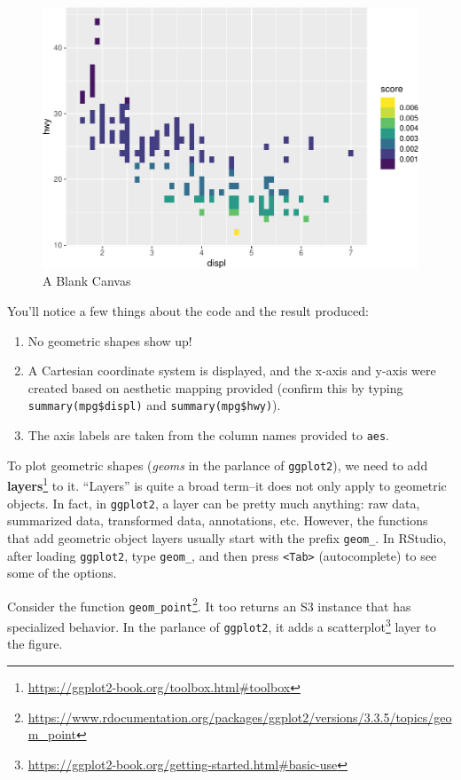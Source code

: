 \documentclass[
  12pt,
  krantz2]{krantz}
\renewcommand{\href}[2]{#2\footnote{\url{#1}}}
\begin{document}
\begin{figure}
\includegraphics[width=0.8\linewidth]{r_and_python_book_files/figure-latex/unnamed-chunk-198-1} \caption{A Blank Canvas}\label{fig:unnamed-chunk-198}
\end{figure}

You'll notice a few things about the code and the result produced:

\begin{enumerate}
\def\labelenumi{\arabic{enumi}.}
\item
  No geometric shapes show up!
\item
  A Cartesian coordinate system is displayed, and the x-axis and y-axis were created based on aesthetic mapping provided (confirm this by typing \texttt{summary(mpg\$displ)} and \texttt{summary(mpg\$hwy)}).
\item
  The axis labels are taken from the column names provided to \texttt{aes}.
\end{enumerate}

To plot geometric shapes (\emph{geoms} in the parlance of \texttt{ggplot2}), we need to add \href{https://ggplot2-book.org/toolbox.html\#toolbox}{\textbf{layers}} to it. ``Layers'' is quite a broad term--it does not only apply to geometric objects. In fact, in \texttt{ggplot2}, a layer can be pretty much anything: raw data, summarized data, transformed data, annotations, etc. However, the functions that add geometric object layers usually start with the prefix \texttt{geom\_}. In RStudio, after loading \texttt{ggplot2}, type \texttt{geom\_}, and then press \texttt{\textless{}Tab\textgreater{}} (autocomplete) to see some of the options.

Consider the function \href{https://www.rdocumentation.org/packages/ggplot2/versions/3.3.5/topics/geom_point}{\texttt{geom\_point}}. It too returns an S3 instance that has specialized behavior. In the parlance of \texttt{ggplot2}, it adds a \href{https://ggplot2-book.org/getting-started.html\#basic-use}{scatterplot} layer to the figure.
\end{document}
